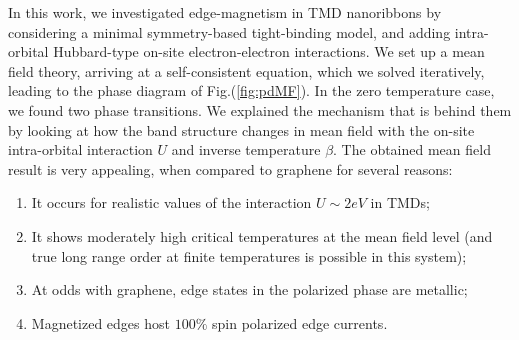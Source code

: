 \label{cap:conclusions}

In this work, we investigated edge-magnetism in \ac{TMD} nanoribbons by considering a minimal symmetry-based tight-binding model, and adding intra-orbital Hubbard-type on-site electron-electron interactions.
We set up a mean field theory, arriving at a self-consistent equation, which we solved iteratively, leading to the phase diagram of Fig.(\ref{fig:pdMF}).
In the zero temperature case, we found two phase transitions.
We explained the mechanism that is behind them by looking at how the band structure changes in mean field with the on-site intra-orbital interaction $U$ and inverse temperature $\beta$.
The obtained mean field result is very appealing, when compared to graphene for several reasons:
\vspace{-0.18cm}
\begin{enumerate}
 \item It occurs for realistic values of the  interaction $U \sim 2 eV$ in \acs{TMD}s;
  \item It shows moderately high critical temperatures at the mean field level (and true long range order at finite temperatures is possible in this system);
  \item At odds with graphene, edge states in the polarized phase are metallic;
  \item Magnetized edges host $100 \%$ spin polarized edge currents.
\end{enumerate}

